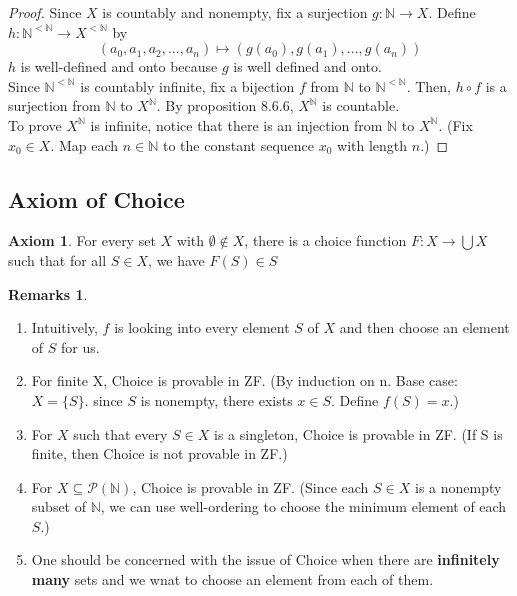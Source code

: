 \documentclass[14pt]{article}
\theoremstyle{definition}
\newtheorem*{remark}{Remarks}
\newtheorem{axiom}[definition]{Axiom}
\newcommand{\fun}[3]{#1\colon #2\rightarrow#3}
\newcommand{\bb}[1]{\mathbb{#1}}
\begin{document}
\begin{proof}
    Since $X$ is countably and nonempty, fix a surjection $\fun{g}{\bb{N}}{X}$. Define 
    $\fun{h}{\bb{N}^{<\bb{N}}}{X^{<\bb{N}}}$ by
    \begin{equation*}
        (a_0, a_1, a_2,..., a_n)\mapsto (g(a_0), g(a_1),..., g(a_n))
    \end{equation*}
    $h$ is well-defined and onto because $g$ is well defined and onto. \\
    Since $\bb{N}^{<\bb{N}}$ is countably infinite, fix a bijection $f$ from $\bb{N}$
    to $\bb{N}^{<\bb{N}}$. Then, $h\circ f$ is a surjection from $\bb{N}$ to $X^{\bb{N}}$.
    By proposition 8.6.6,  $X^{\bb{N}}$ is countable.\\
    To prove  $X^{\bb{N}}$ is infinite, notice that there is an injection from $\bb{N}$ to $X^{\bb{N}}$.
    (Fix $x_0\in X$. Map each $n\in\bb{N}$ to the constant sequence $x_0$ with length $n$.)
\end{proof}

\vspace{5mm}

\subsection{Axiom of Choice}

\begin{axiom}
For every set $X$ with $\emptyset\not\in X$, there is a choice function $\fun{F}{X}{\bigcup X}$ such that
for all $S\in X$, we have $F(S)\in S$
\end{axiom}

\begin{remark}\hfill
    \begin{enumerate}
        \item Intuitively, $f$ is looking into every element $S$ of $X$ and then choose an element of $S$ for us.
        \item For finite X, Choice is provable in ZF. (By induction on n. Base case: $X=\{S\}$. since 
        $S$ is nonempty, there exists $x\in S$. Define $f(S)=x$.)
        \item For $X$ such that every $S\in X$ is a singleton, Choice is provable in ZF. (If S is finite, then Choice is not provable in ZF.)
        \item For $X\subseteq \mathcal{P}(\bb{N})$, Choice is provable in ZF. (Since each $S\in X$ is a nonempty subset of $\bb{N}$, we can use well-ordering to choose the minimum element of each $S$.)
        \item One should be concerned with the issue of Choice when there are
        \textbf{infinitely many} sets and we wnat to choose an element from each of them.
    \end{enumerate}
\end{remark}
\end{document}
